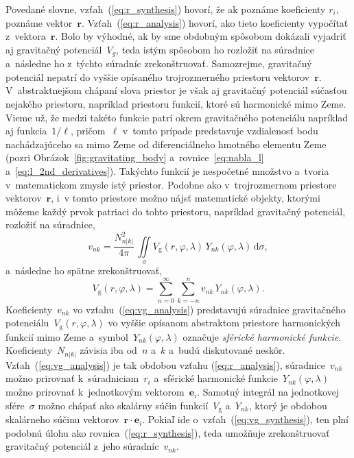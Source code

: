 \documentclass[a4paper, 12pt]{book}
\newcommand{\diff}{\mathrm d}
\newcommand{\gidx}{\mathrm g}
\let\vec\mathbf
\begin{document}
Povedané slovne, vzťah~(\ref{eq:r_synthesis}) hovorí, že ak poznáme koeficienty 
$r_i$, poznáme vektor~$\vec r$.  Vzťah~(\ref{eq:r_analysis}) hovorí, ako tieto 
koeficienty vypočítať z~vektora~$\vec r$.  Bolo by výhodné, ak by sme obdobným 
spôsobom dokázali vyjadriť aj gravitačný potenciál~$V_g$, teda istým spôsobom 
ho rozložiť na súradnice a~následne ho z~týchto súradníc zrekonštruovať.  
Samozrejme, gravitačný potenciál nepatrí do vyššie opísaného trojrozmerného 
priestoru vektorov~$\vec r$.  V~abstraktnejšom chápaní slova priestor je však 
aj gravitačný potenciál súčasťou nejakého priestoru, napríklad priestoru 
funkcií, ktoré sú harmonické mimo Zeme.  Vieme už, že medzi takéto funkcie 
patrí okrem gravitačného potenciálu napríklad aj funkcia~$1 \slash \ell$, 
pričom~$\ell$ v~tomto prípade predstavuje vzdialenosť bodu nachádzajúceho sa 
mimo Zeme od diferenciálneho hmotného elementu Zeme (pozri 
Obrázok~\ref{fig:gravitating_body} a~rovnice~\ref{eq:nabla_l} 
a~\ref{eq:l_2nd_derivatives}).  Takýchto funkcií je nespočetné množstvo 
a~tvoria v~matematickom zmysle istý priestor.  Podobne ako v~trojrozmernom 
priestore vektorov~$\vec r$, i~v tomto priestore možno nájsť matematické 
objekty, ktorými môžeme každý prvok patriaci do tohto priestoru, napríklad 
gravitačný potenciál, rozložiť na súradnice,
%
\begin{equation}
\label{eq:vg_analysis}
v_{nk} = \frac{N^2_{n|k|}}{4\pi} \, \iint\limits_{\sigma} V_\gidx(r, \varphi, 
\lambda) \, Y_{nk}(\varphi, \lambda) \, \diff \sigma{,}
\end{equation}
%
a~následne ho spätne zrekonštruovať,
%
\begin{equation}
\label{eq:vg_synthesis}
V_\gidx(r, \varphi, \lambda) = \sum_{n = 0}^{\infty} \sum_{k = -n}^{n} v_{nk}
\, Y_{nk}(\varphi, \lambda){.}
\end{equation}
%
Koeficienty~$v_{nk}$ vo vzťahu~(\ref{eq:vg_analysis}) predstavujú súradnice
gravitačného potenciálu~$V_\gidx(r, \varphi, \lambda)$ vo vyššie opísanom
abstraktom priestore harmonických funkcií mimo Zeme a~symbol~$Y_{nk}(\varphi, 
\lambda)$
označuje \emph{sférické harmonické funkcie}.  Koeficienty~$N_{n|k|}$ závisia
iba od~$n$ a~$k$ a~budú diskutované neskôr.  Vzťah~(\ref{eq:vg_analysis}) je
tak obdobou vzťahu (\ref{eq:r_analysis}), súradnice~$v_{nk}$ možno prirovnať
k~súradniciam~$r_i$ a~sférické harmonické funkcie~$Y_{nk}(\varphi, \lambda)$
možno prirovnať k~jednotkovým vektorom~$\vec e_i$.  Samotný integrál na
jednotkovej sfére~$\sigma$ možno chápať ako skalárny súčin funkcií~$V_\gidx$
a~$Y_{nk}$, ktorý je obdobou skalárneho súčinu vektorov~$\vec r \cdot \vec
e_i$.  Pokiaľ ide o~vzťah~(\ref{eq:vg_synthesis}), ten plní podobnú úlohu ako
rovnica~(\ref{eq:r_synthesis}), teda umožňuje zrekonštruovať gravitačný
potenciál z~jeho súradníc~$v_{nk}$.
\end{document}
